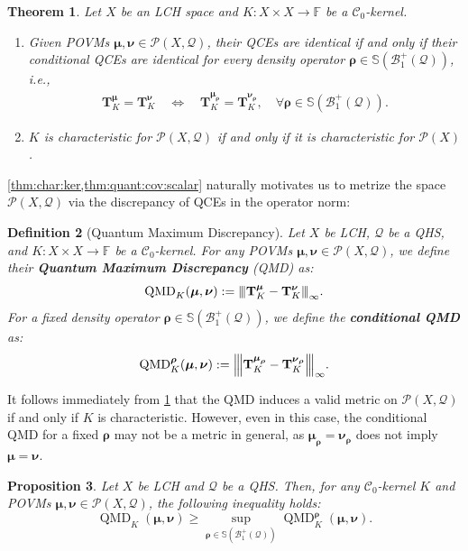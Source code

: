 \documentclass[noinfoline]{imsart}\setcounter{tocdepth}{2}
\renewcommand{\b}[1]{\mathbb{#1}} %
\newcommand{\m}[1]{\mathbf{#1}} %
\newcommand{\s}[1]{\mathscr{#1}} %
\renewcommand{\c}[1]{\mathcal{#1}} %
\newcommand{\mb}[1]{\boldsymbol{#1}} %
\newcommand{\vertiii}[1]{{\left\vert\kern-0.25ex\left\vert\kern-0.25ex\left\vert #1 
    \right\vert\kern-0.25ex\right\vert\kern-0.25ex\right\vert}} %
\newcommand{\QMD}{\operatorname{QMD}}
\theoremstyle{plain}
\newtheorem{theorem}{Theorem}[section]
\newtheorem{proposition}[theorem]{Proposition}
\newtheorem{definition}[theorem]{Definition}
\begin{document}
\begin{theorem}\label{thm:char:ker}
Let $X$ be an LCH space and $K:X \times X \to \b{F}$ be a $\c{C}_{0}$-kernel. 
\begin{enumerate}[leftmargin = *]
\item Given POVMs $\mb{\mu}, \mb{\nu} \in \s{P}(X, \c{Q})$, their QCEs are identical if and only if their conditional QCEs are identical for every density operator $\mb{\rho} \in \b{S}(\c{B}_{1}^{+}(\c{Q}))$, i.e.,
\begin{align*}
    \m{T}_{K}^{\mb{\mu}} = \m{T}_{K}^{\mb{\nu}} \quad \iff \quad \m{T}_{K}^{\mb{\mu}_{\mb{\rho}}} = \m{T}_{K}^{\mb{\nu}_{\mb{\rho}}}, \quad \forall \mb{\rho} \in \b{S}(\c{B}_{1}^{+}(\c{Q})).
\end{align*}
\item $K$ is characteristic for $\s{P}(X, \c{Q})$ if and only if it is characteristic for $\s{P}(X)$.  
\end{enumerate}
\end{theorem}


\cref{thm:char:ker,thm:quant:cov:scalar} naturally motivates us to metrize the space $\s{P}(X, \c{Q})$ via the discrepancy of QCEs in the operator norm:
\begin{definition}[Quantum Maximum Discrepancy]
Let $X$ be LCH, $\c{Q}$ be a QHS, and $K:X \times X \to \b{F}$ be a $\c{C}_{0}$-kernel. For any POVMs $\mb{\mu}, \mb{\nu} \in \s{P}(X, \c{Q})$, we define their \textbf{Quantum Maximum Discrepancy} (QMD) as:
\begin{equation*}
    \QMD_{K}(\mb{\mu}, \mb{\nu}) := \vertiii{\m{T}_{K}^{\mb{\mu}} - \m{T}_{K}^{\mb{\nu}}}_{\infty}.
\end{equation*}
For a fixed density operator $\mb{\rho} \in \b{S}(\c{B}_{1}^{+}(\c{Q}))$, we define the \textbf{conditional QMD} as:
\begin{equation*}
    \QMD_{K}^{\mb{\rho}}(\mb{\mu}, \mb{\nu}) := \vertiii{\m{T}_{K}^{\mb{\mu}_{\mb{\rho}}} - \m{T}_{K}^{\mb{\nu}_{\mb{\rho}}}}_{\infty}.
\end{equation*}
\end{definition}

It follows immediately from \cref{thm:char:ker} that the QMD induces a valid metric on $\s{P}(X, \c{Q})$ if and only if $K$ is characteristic. However, even in this case, the conditional QMD for a fixed $\mb{\rho}$ may not be a metric in general, as $\mb{\mu}_{\mb{\rho}} = \mb{\nu}_{\mb{\rho}}$ does not imply $\mb{\mu} = \mb{\nu}$.

\begin{proposition}\label{prop:ineq:QCE}
Let $X$ be LCH and $\c{Q}$ be a QHS. Then, for any $\c{C}_{0}$-kernel $K$ and POVMs $\mb{\mu}, \mb{\nu} \in \s{P}(X, \c{Q})$, the following inequality holds:
\begin{equation*}
    \QMD_{K}(\mb{\mu}, \mb{\nu}) \ge \sup_{\mb{\rho} \in \b{S}(\c{B}_{1}^{+}(\c{Q}))} \QMD_{K}^{\mb{\rho}}(\mb{\mu}, \mb{\nu}).
\end{equation*}
\end{proposition}
\end{document}
